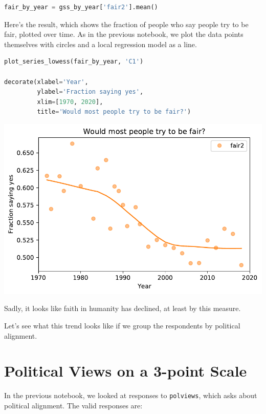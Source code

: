 \begin{lstlisting}[language=Python]
fair_by_year = gss_by_year['fair2'].mean()
\end{lstlisting}

Here's the result, which shows the fraction of people who say people try
to be fair, plotted over time. As in the previous notebook, we plot the
data points themselves with circles and a local regression model as a
line.

\begin{lstlisting}[language=Python]
plot_series_lowess(fair_by_year, 'C1')

decorate(xlabel='Year',
         ylabel='Fraction saying yes',
         xlim=[1970, 2020],
         title='Would most people try to be fair?')
\end{lstlisting}

\begin{center}
\includegraphics[scale=0.75]{chapters/03_outlook_files/03_outlook_32_0.pdf}
\end{center}

Sadly, it looks like faith in humanity has declined, at least by this
measure.

Let's see what this trend looks like if we group the respondents by
political alignment.

\hypertarget{political-views-on-a-3-point-scale}{%
\section{Political Views on a 3-point
Scale}\label{political-views-on-a-3-point-scale}}

In the previous notebook, we looked at responses to
\passthrough{\lstinline!polviews!}, which asks about political
alignment. The valid responses are:

